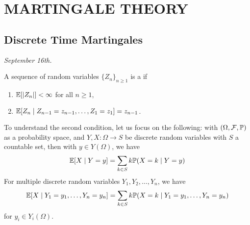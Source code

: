 \chapter{MARTINGALE THEORY}

\section{Discrete Time Martingales}
\textit{September 16th.}

\begin{definition}
    A sequence of random variables $\{Z_{n}\}_{n \geq 1}$ is a  if
    \begin{enumerate}
        \item $\mathbb{E}[\left| Z_{n} \right|] < \infty$ for all $n \geq 1$,
        \item $\mathbb{E}[Z_{n} \mid Z_{n-1} = z_{n-1}, \ldots, Z_{1} = z_{1}] = z_{n-1}$.
    \end{enumerate}
\end{definition}
To understand the second condition, let us focus on the following: with $(\Omega,\mathcal{F},\mathbb{P})$ as a probability space, and $Y,X:\Omega \to S$ be discrete random variables with $S$ a countable set, then with $y \in Y(\Omega)$, we have
\begin{align}
    \mathbb{E}[X \mid Y = y] = \sum_{k \in S} k \mathbb{P}(X = k \mid Y = y)
\end{align}
For multiple discrete random variables $Y_{1},Y_{2},\ldots,Y_{n}$, we have
\begin{align}
    \mathbb{E}[X \mid Y_{1}=y_{1},\ldots,Y_{n}=y_{n}] = \sum_{k \in S} k \mathbb{P}(X=k \mid Y_{1}=y_{1},\ldots,Y_{n}=y_{n})
\end{align}
for $y_{i} \in Y_{i}(\Omega)$.

